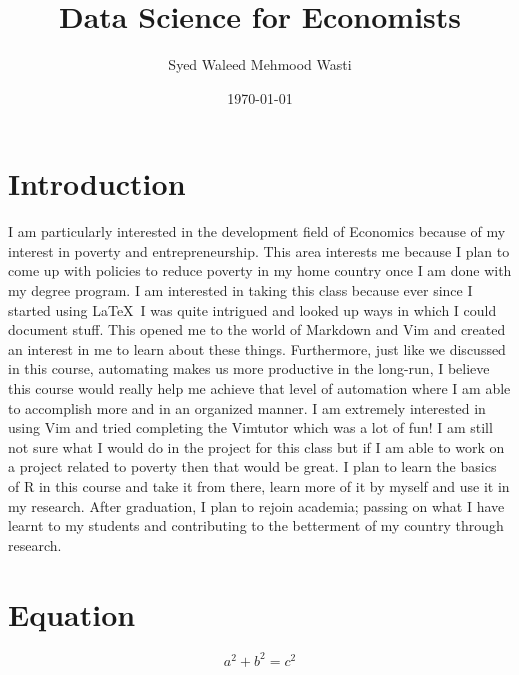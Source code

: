 \documentclass[12pt]{article}
\title{\textbf{Data Science for Economists}}
\author{Syed Waleed Mehmood Wasti}
\date{\today}
\begin{document}
\maketitle

\section*{Introduction}

I am particularly interested in the development field of Economics because of my interest in poverty and entrepreneurship. This area interests me because I plan to come up with policies to reduce poverty in my home country once I am done with my degree program. I am interested in taking this class because ever since I started using \LaTeX\, I was quite intrigued and looked up ways in which I could document stuff. This opened me to the world of Markdown and Vim and created an interest in me to learn about these things. Furthermore, just like we discussed in this course, automating makes us more productive in the long-run, I believe this course would really help me achieve that level of automation where I am able to accomplish more and in an organized manner. I am extremely interested in using Vim and tried completing the Vimtutor which was a lot of fun! I am still not sure what I would do in the project for this class but if I am able to work on a project related to poverty then that would be great. I plan to learn the basics of R in this course and take it from there, learn more of it by myself and use it in my research. After graduation, I plan to rejoin academia; passing on what I have learnt to my students and contributing to the betterment of my country through research. \\

\section*{Equation} 

\begin{equation}
    a^2 + b^2 = c^2
\end{equation}
\end{document}
